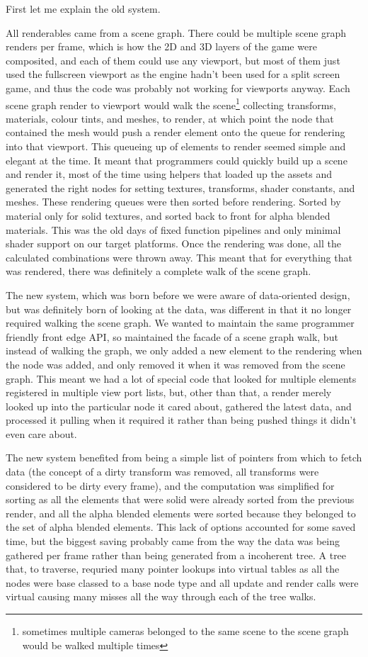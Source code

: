 First let me explain the old system.

All renderables came from a scene graph. There could be multiple scene graph
renders per frame, which is how the 2D and 3D layers of the game were
composited, and each of them could use any viewport, but most of them just used
the fullscreen viewport as the engine hadn't been used for a split screen game,
and thus the code was probably not working for viewports anyway. Each scene
graph render to viewport would walk the scene\footnote{sometimes multiple
cameras belonged to the same scene to the scene graph would be walked multiple
times} collecting transforms, materials, colour tints, and meshes, to render,
at which point the node that contained the mesh would push a render element
onto the queue for rendering into that viewport. This queueing up of elements
to render seemed simple and elegant at the time. It meant that programmers
could quickly build up a scene and render it, most of the time using helpers
that loaded up the assets and generated the right nodes for setting textures,
transforms, shader constants, and meshes. These rendering queues were then
sorted before rendering. Sorted by material only for solid textures, and sorted
back to front for alpha blended materials. This was the old days of fixed
function pipelines and only minimal shader support on our target platforms.
Once the rendering was done, all the calculated combinations were thrown away.
This meant that for everything that was rendered, there was definitely a
complete walk of the scene graph.

The new system, which was born before we were aware of data-oriented design,
but was definitely born of looking at the data, was different in that it no
longer required walking the scene graph. We wanted to maintain the same
programmer friendly front edge API, so maintained the facade of a scene graph
walk, but instead of walking the graph, we only added a new element to the
rendering when the node was added, and only removed it when it was removed from
the scene graph. This meant we had a lot of special code that looked for
multiple elements registered in multiple view port lists, but, other than that,
a render merely looked up into the particular node it cared about, gathered the
latest data, and processed it pulling when it required it rather than being
pushed things it didn't even care about.

The new system benefited from being a simple list of pointers from which to
fetch data (the concept of a dirty transform was removed, all transforms were
considered to be dirty every frame), and the computation was simplified for
sorting as all the elements that were solid were already sorted from the
previous render, and all the alpha blended elements were sorted because they
belonged to the set of alpha blended elements. This lack of options accounted
for some saved time, but the biggest saving probably came from the way the data
was being gathered per frame rather than being generated from a incoherent
tree. A tree that, to traverse, requried many pointer lookups into virtual
tables as all the nodes were base classed to a base node type and all update
and render calls were virtual causing many misses all the way through each of
the tree walks.

